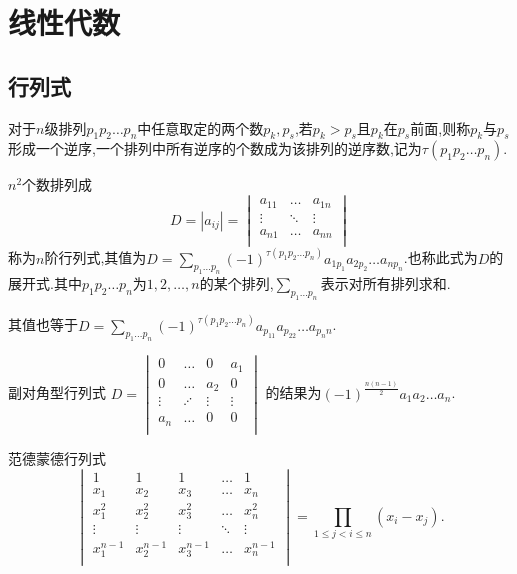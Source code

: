 \section{线性代数}
\subsection{行列式}
\begin{definition}[逆序数]
    对于$n$级排列$p_1p_2\dots p_n$中任意取定的两个数$p_k,p_s$,若$p_k>p_s$且$p_k$在$p_s$前面,则称$p_k$与$p_s$形成一个逆序,一个排列中所有逆序的个数成为该排列的逆序数,记为$\tau (p_1p_2\dots p_n)$.
\end{definition}
\begin{definition}[$n$阶行列式]
    $n^2$个数排列成
    \begin{equation*}
        D=\left\lvert a_{ij}\right\rvert= 
        \begin{vmatrix}
        a_{11}   &   \dots   &   a_{1n}   \\
        \vdots   &   \ddots   &   \vdots   \\
        a_{n1}   &   \dots   &   a_{nn}   \\
        \end{vmatrix}
    \end{equation*}
    称为$n$阶行列式,其值为$\displaystyle D=\sum_{p_1\dots p_n} (-1)^{\tau (p_1p_2\dots p_n)}a_{1p_1}a_{2p_2}\dots a_{np_n}$.也称此式为$D$的展开式.其中$p_1p_2\dots p_n$为$1,2,\dots,n$的某个排列,$\displaystyle \sum_{p_1\dots p_n}$表示对所有排列求和.

    其值也等于$\displaystyle D=\sum_{p_1\dots p_n} (-1)^{\tau (p_1p_2\dots p_n)}a_{p_11}a_{p_22}\dots a_{p_nn}$.
\end{definition}
副对角型行列式
$D=
\begin{vmatrix}
    0   &   \dots   &   0   &   a_1   \\
    0   &   \dots   &   a_2   &   0   \\
    \vdots   &   \iddots   &   \vdots   &   \vdots   \\
    a_n   &   \dots   &   0   &   0   \\
    \end{vmatrix}$
的结果为$(-1)^{\frac{n(n-1)}{2}}a_1a_2\dots a_n$.

范德蒙德行列式
\begin{equation*}
    \begin{vmatrix}
    1   &   1   &   1   &   \dots   &   1   \\
    x_1   &   x_2   &   x_3   &   \dots   &   x_n   \\
    x_1^2   &   x_2^2   &   x_3^2   &   \dots   &   x_n^2   \\
    \vdots   &   \vdots   &   \vdots   &   \ddots   &   \vdots   \\
    x_1^{n-1}   &   x_2^{n-1}   &   x_3^{n-1}   &   \dots   &   x_n^{n-1}   \\
    \end{vmatrix}
    =\prod _{1 \leqslant j<i \leqslant n}(x_i-x_j).
\end{equation*}

